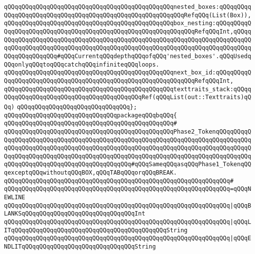 \verb|qQQqqQQqqQQqqQQqqQQqqQQqqQQqqQQqqQQqqQQqqQQqqQQqnested_boxes:qQQqqQQqqQQqqQQqqQQqqQQqqQQqqQQqqQQqqQQqqQQqqQQqqQQqqQQqqQQqRefqQQq(List(Box)),|\newline
\verb|qQQqqQQqqQQqqQQqqQQqqQQqqQQqqQQqqQQqqQQqqQQqqQQqbox_nesting:qQQqqQQqqQQqqQQqqQQqqQQqqQQqqQQqqQQqqQQqqQQqqQQqqQQqqQQqqQQqqQQqRefqQQqInt,qQQqqQQqqQQqqQQqqQQqqQQqqQQqqQQqqQQqqQQqqQQqqQQqqQQqqQQqqQQqqQQqqQQqqQQqqQQqqQQqqQQqqQQqqQQqqQQqqQQqqQQqqQQqqQQqqQQqqQQqqQQqqQQqqQQqqQQqqQQqqQQqqQQqqQQqqQQqqQQq#qQQqCurrentqQQqdepthqQQqofqQQq'nested_boxes'.qQQqUsedqQQqonlyqQQqtoqQQqcatchqQQqinfiniteqQQqloops.|\newline
\newline
\verb|qQQqqQQqqQQqqQQqqQQqqQQqqQQqqQQqqQQqqQQqqQQqqQQqnext_box_id:qQQqqQQqqQQqqQQqqQQqqQQqqQQqqQQqqQQqqQQqqQQqqQQqqQQqqQQqqQQqqQQqRefqQQqInt,|\newline
\newline
\verb|qQQqqQQqqQQqqQQqqQQqqQQqqQQqqQQqqQQqqQQqqQQqqQQqtexttraits_stack:qQQqqQQqqQQqqQQqqQQqqQQqqQQqqQQqqQQqqQQqqQQqRef(qQQqList(out::Texttraits)qQQq)|\newline
\verb|qQQqqQQqqQQqqQQqqQQqqQQqqQQqqQQq};|\newline
\newline
\newline
\verb|qQQqqQQqqQQqqQQqqQQqqQQqqQQqqQQqpackageqQQqbqQQq{|\newline
\verb|qQQqqQQqqQQqqQQqqQQqqQQqqQQqqQQqqQQqqQQqqQQqqQQq#|\newline
\verb|qQQqqQQqqQQqqQQqqQQqqQQqqQQqqQQqqQQqqQQqqQQqqQQqPhase2_TokenqQQqqQQqqQQqqQQqqQQqqQQqqQQqqQQqqQQqqQQqqQQqqQQqqQQqqQQqqQQqqQQqqQQqqQQqqQQqqQQqqQQqqQQqqQQqqQQqqQQqqQQqqQQqqQQqqQQqqQQqqQQqqQQqqQQqqQQqqQQqqQQqqQQqqQQqqQQqqQQqqQQqqQQqqQQqqQQqqQQqqQQqqQQqqQQqqQQqqQQqqQQqqQQqqQQqqQQqqQQqqQQqqQQqqQQqqQQqqQQqqQQqqQQqqQQqqQQq#qQQqSameqQQqasqQQqPhase1_TokenqQQqexceptqQQqwithoutqQQqBOX,qQQqTABqQQqorqQQqBREAK.|\newline
\verb|qQQqqQQqqQQqqQQqqQQqqQQqqQQqqQQqqQQqqQQqqQQqqQQqqQQqqQQqqQQqqQQq#|\newline
\verb|qQQqqQQqqQQqqQQqqQQqqQQqqQQqqQQqqQQqqQQqqQQqqQQqqQQqqQQqqQQqqQQq=qQQqNEWLINE|\newline
\verb|qQQqqQQqqQQqqQQqqQQqqQQqqQQqqQQqqQQqqQQqqQQqqQQqqQQqqQQqqQQqqQQq|\verb#|qQQqBLANKSqQQqqQQqqQQqqQQqqQQqqQQqqQQqqQQqInt#\newline
\verb|qQQqqQQqqQQqqQQqqQQqqQQqqQQqqQQqqQQqqQQqqQQqqQQqqQQqqQQqqQQqqQQq|\verb#|qQQqLITqQQqqQQqqQQqqQQqqQQqqQQqqQQqqQQqqQQqqQQqqQQqString#\newline
\verb|qQQqqQQqqQQqqQQqqQQqqQQqqQQqqQQqqQQqqQQqqQQqqQQqqQQqqQQqqQQqqQQq|\verb#|qQQqENDLITqQQqqQQqqQQqqQQqqQQqqQQqqQQqqQQqString#\newline
